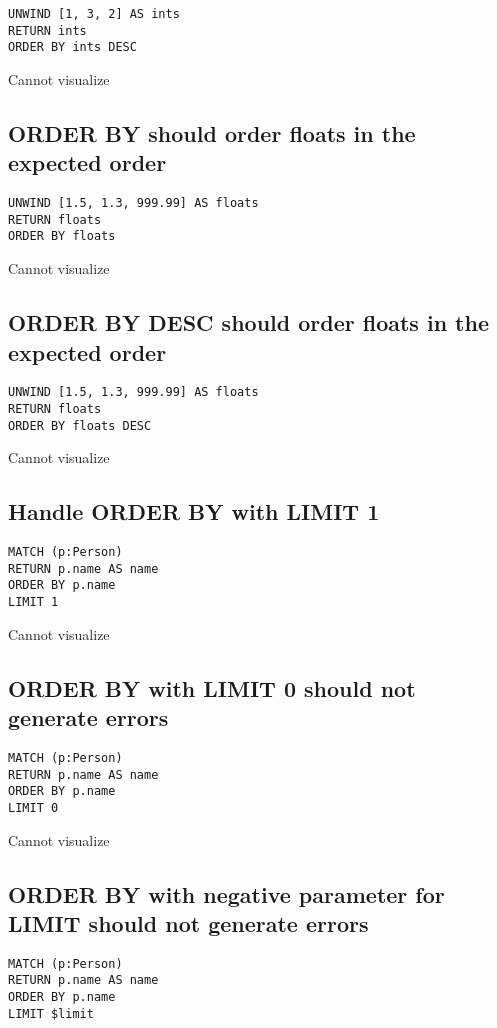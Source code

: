 \begin{lstlisting}
UNWIND [1, 3, 2] AS ints
RETURN ints
ORDER BY ints DESC
\end{lstlisting}

Cannot visualize
\subsection{ORDER BY should order floats in the expected order}

\begin{lstlisting}
UNWIND [1.5, 1.3, 999.99] AS floats
RETURN floats
ORDER BY floats
\end{lstlisting}

Cannot visualize
\subsection{ORDER BY DESC should order floats in the expected order}

\begin{lstlisting}
UNWIND [1.5, 1.3, 999.99] AS floats
RETURN floats
ORDER BY floats DESC
\end{lstlisting}

Cannot visualize
\subsection{Handle ORDER BY with LIMIT 1}

\begin{lstlisting}
MATCH (p:Person)
RETURN p.name AS name
ORDER BY p.name
LIMIT 1
\end{lstlisting}

Cannot visualize
\subsection{ORDER BY with LIMIT 0 should not generate errors}

\begin{lstlisting}
MATCH (p:Person)
RETURN p.name AS name
ORDER BY p.name
LIMIT 0
\end{lstlisting}

Cannot visualize
\subsection{ORDER BY with negative parameter for LIMIT should not generate errors}

\begin{lstlisting}
MATCH (p:Person)
RETURN p.name AS name
ORDER BY p.name
LIMIT $limit
\end{lstlisting}

